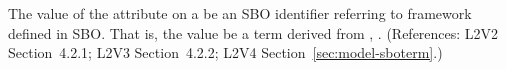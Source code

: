 The value of the  attribute on a \Model {} be
an SBO identifier referring to  framework defined
in SBO.  That is, the value  be a term derived from
\changed{\sbointeractionID}, .  (References: L2V2
Section~4.2.1; L2V3 Section~4.2.2; L2V4 Section~\ref{sec:model-sboterm}.)
